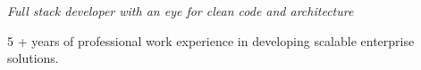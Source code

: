 \noindent \emph{Full stack developer with  an eye for clean code and architecture}

5 + years of professional work experience in developing scalable enterprise solutions.